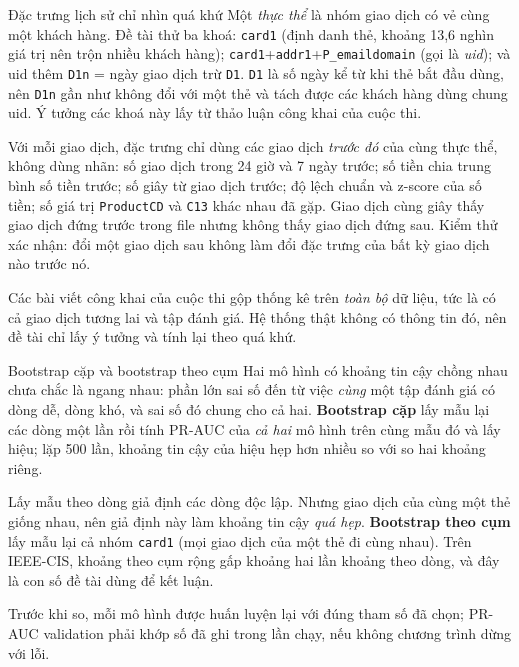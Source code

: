 \documentclass[11pt,a4paper]{article}
\newcommand{\code}[1]{\texttt{\small #1}}
\begin{document}
\begin{explain}{Đặc trưng lịch sử chỉ nhìn quá khứ}
Một \emph{thực thể} là nhóm giao dịch có vẻ cùng một khách hàng. Đề tài thử ba khoá: \code{card1} (định danh thẻ, khoảng 13,6 nghìn giá trị nên trộn nhiều khách hàng); \code{card1}+\code{addr1}+\code{P\_emaildomain} (gọi là \emph{uid}); và uid thêm \code{D1n} = ngày giao dịch trừ \code{D1}. \code{D1} là số ngày kể từ khi thẻ bắt đầu dùng, nên \code{D1n} gần như không đổi với một thẻ và tách được các khách hàng dùng chung uid. Ý tưởng các khoá này lấy từ thảo luận công khai của cuộc thi.

Với mỗi giao dịch, đặc trưng chỉ dùng các giao dịch \emph{trước đó} của cùng thực thể, không dùng nhãn: số giao dịch trong 24 giờ và 7 ngày trước; số tiền chia trung bình số tiền trước; số giây từ giao dịch trước; độ lệch chuẩn và z-score của số tiền; số giá trị \code{ProductCD} và \code{C13} khác nhau đã gặp. Giao dịch cùng giây thấy giao dịch đứng trước trong file nhưng không thấy giao dịch đứng sau. Kiểm thử xác nhận: đổi một giao dịch sau không làm đổi đặc trưng của bất kỳ giao dịch nào trước nó.

Các bài viết công khai của cuộc thi gộp thống kê trên \emph{toàn bộ} dữ liệu, tức là có cả giao dịch tương lai và tập đánh giá. Hệ thống thật không có thông tin đó, nên đề tài chỉ lấy ý tưởng và tính lại theo quá khứ.
\end{explain}

\begin{explain}{Bootstrap cặp và bootstrap theo cụm}
Hai mô hình có khoảng tin cậy chồng nhau chưa chắc là ngang nhau: phần lớn sai số đến từ việc \emph{cùng} một tập đánh giá có dòng dễ, dòng khó, và sai số đó chung cho cả hai. \textbf{Bootstrap cặp} lấy mẫu lại các dòng một lần rồi tính PR-AUC của \emph{cả hai} mô hình trên cùng mẫu đó và lấy hiệu; lặp 500 lần, khoảng tin cậy của hiệu hẹp hơn nhiều so với so hai khoảng riêng.

Lấy mẫu theo dòng giả định các dòng độc lập. Nhưng giao dịch của cùng một thẻ giống nhau, nên giả định này làm khoảng tin cậy \emph{quá hẹp}. \textbf{Bootstrap theo cụm} lấy mẫu lại cả nhóm \code{card1} (mọi giao dịch của một thẻ đi cùng nhau). Trên IEEE-CIS, khoảng theo cụm rộng gấp khoảng hai lần khoảng theo dòng, và đây là con số đề tài dùng để kết luận.

Trước khi so, mỗi mô hình được huấn luyện lại với đúng tham số đã chọn; PR-AUC validation phải khớp số đã ghi trong lần chạy, nếu không chương trình dừng với lỗi.
\end{explain}
\end{document}
